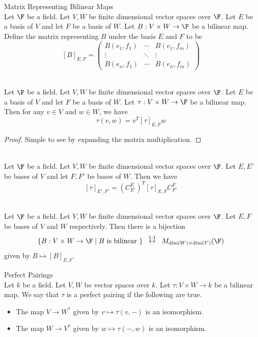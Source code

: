 \documentclass[a4paper]{article}
\begin{document}
\begin{defn}{Matrix Representing Bilinear Maps}{}\\
Let $\F$ be a field. Let $V,W$ be finite dimensional vector spaces over $\F$. Let $E$ be a basis of $V$ and let $F$ be a basis of $W$. Let $B:V\times W\to\F$ be a bilinear map. Define the matrix representing $B$ under the basis $E$ and $F$ to be $$[B]_{E,F}=\begin{pmatrix}
B(e_1,f_1) & \cdots & B(e_1,f_m)\\
\vdots & \ddots & \vdots\\
B(e_n,f_1) & \cdots & B(e_n,f_m)
\end{pmatrix}$$
\end{defn}

\begin{prp}{}{}\\
Let $\F$ be a field. Let $V,W$ be finite dimensional vector spaces over $\F$. Let $E$ be a basis of $V$ and let $F$ be a basis of $W$. Let $\tau:V\times W\to\F$ be a bilinear map. Then for any $v\in V$ and $w\in W$, we have $$\tau(v,w)=v^T[\tau]_{E,F}w$$ 
\begin{proof}
Simple to see by expanding the matrix multiplication. 
\end{proof}
\end{prp}

\begin{prp}{}{}\\
Let $\F$ be a field. Let $V,W$ be finite dimensional vector spaces over $\F$. Let $E,E'$ be bases of $V$ and let $F,F'$ be bases of $W$. Then we have $$[\tau]_{E',F'}=(C_{E'}^E)^T[\tau]_{E,F}C_{F'}^F$$
\end{prp}

\begin{prp}{}{}\\
Let $\F$ be a field. Let $V,W$ be finite dimensional vector spaces over $\F$. Let $E,F$ be bases of $V$ and $W$ respectively. Then there is a bijection $$\{B:V\times W\to\F\;|\;B\text{ is bilinear }\}\;\;\overset{1:1}{\leftrightarrow}\;\;M_{\dim(W)\times\dim(V)}(\F)$$ given by $B\mapsto[B]_{E,F}$. 
\end{prp}

\begin{defn}{Perfect Pairings}{}\\
Let $k$ be a field. Let $V,W$ be vector spaces over $k$. Let $\tau:V\times W\to k$ be a bilinear map. We say that $\tau$ is a perfect pairing if the following are true. 
\begin{itemize}
\item The map $V\to W^\ast$ given by $v\mapsto\tau(v,-)$ is an isomorphism. 
\item The map $W\to V^\ast$ given by $w\mapsto\tau(-,w)$ is an isomorphism. 
\end{itemize}
\end{defn}
\end{document}
